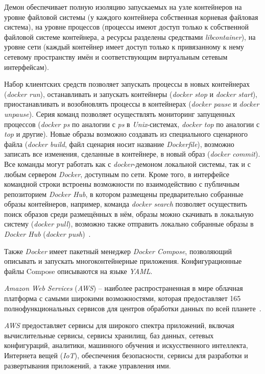 Демон обеспечивает полную изоляцию запускаемых на узле контейнеров на уровне файловой системы (у каждого контейнера собственная корневая файловая система), на уровне процессов (процессы имеют доступ только к собственной файловой системе контейнера, а ресурсы разделены средствами \textit{libcontainer}), на уровне сети (каждый контейнер имеет доступ только к привязанному к нему сетевому пространству имён и соответствующим виртуальным сетевым интерфейсам).

Набор клиентских средств позволяет запускать процессы в новых контейнерах (\textit{docker run}), останавливать и запускать контейнеры (\textit{docker stop} и \textit{docker start}), приостанавливать и возобновлять процессы в контейнерах (\textit{docker pause} и \textit{docker unpause}). Серия команд позволяет осуществлять мониторинг запущенных процессов (\textit{docker ps} по аналогии с \textit{ps} в \textit{Unix}-системах, \textit{docker top} по аналогии с \textit{top} и другие). Новые образы возможно создавать из специального сценарного файла (\textit{docker build}, файл сценария носит название \textit{Dockerfile}), возможно записать все изменения, сделанные в контейнере, в новый образ (\textit{docker commit}). Все команды могут работать как с \textit{docker}-демоном локальной системы, так и с любым сервером \textit{Docker}, доступным по сети. Кроме того, в интерфейсе командной строки встроены возможности по взаимодействию с публичным репозиторием \textit{Docker Hub}, в котором размещены предварительно собранные образы контейнеров, например, команда \textit{docker search} позволяет осуществить поиск образов среди размещённых в нём, образы можно скачивать в локальную систему (\textit{docker pull}), возможно также отправить локально собранные образы в \textit{Docker Hub} (\textit{docker push})~\cite{docker}.

Также \textit{Docker} имеет пакетный менеджер \textit{Docker Compose}, позволяющий описывать и запускать многоконтейнерные приложения. Конфигурационные файлы Compose описываются на языке \textit{YAML}.

\textit{Amazon Web Services} (\textit{AWS}) – наиболее распространенная в мире облачная платформа с самыми широкими возможностями, которая предоставляет 165 полнофункциональных сервисов для центров обработки данных по всей планете~\cite{aws}.

\textit{AWS} предоставляет сервисы для широкого спектра приложений, включая вычислительные сервисы, сервисы хранилищ, баз данных, сетевых конфигураций, аналитики, машинного обучения и искусственного интеллекта, Интернета вещей (\textit{IoT}), обеспечения безопасности, сервисы для разработки и развертывания приложений, а также управления ими.


